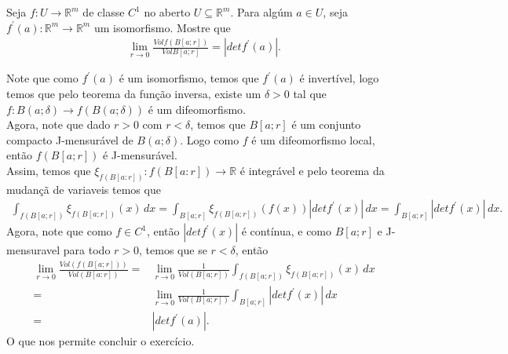 \begin{homeworkProblem}[Seção 5-1]
  Seja $f:U\to\mathbb{R}^{m}$ de classe $C^{1}$ no aberto $U\subseteq\mathbb{R}^{m}$. Para algúm $a\in U$, seja $f^{\prime}(a):\mathbb{R}^{m}\to\mathbb{R}^{m}$ um isomorfismo. Mostre que
  \begin{align*}
    \lim_{r \to 0}\frac{Vol f(B[a;r])}{Vol B[a;r]}=|det f^{\prime}(a)|.
  \end{align*}
  \begin{solution}
    Note que como $f^{\prime}(a)$ é um isomorfismo, temos que $f^{\prime}(a)$ é invertível, logo temos que pelo teorema da função inversa, existe um $\delta>0$ tal que $f:B(a;\delta)\to f(B(a;\delta))$ é um difeomorfismo.\\
    Agora, note que dado $r>0$ com $r<\delta$, temos que $B[a;r]$ é um conjunto compacto J-mensurável de $B(a;\delta)$. Logo como $f$ é um difeomorfismo local, então $f(B[a;r])$ é J-mensurável.\\
    Assim, temos que $\xi_{f(B[a:r])}:f(B[a:r])\to\mathbb{R}$ é integrável e pelo teorema da mudançã de variaveis temos que 
    \begin{align*}
      \int_{f(B[a;r])}\xi_{f(B[a;r])}(x)\,dx=\int_{B[a;r]}\xi_{f(B[a;r])}(f(x))|det f^{\prime}(x)|\,dx=\int_{B[a;r]}|det f^{\prime}(x)|\,dx.
    \end{align*}
    Agora, note que como $f\in C^{1}$, então $|det f^{\prime}(x)|$ é contínua, e como $B[a;r]$ e J-mensuravel para todo $r>0$, temos que se $r<\delta$, então
    \begin{align*}
      \lim_{r \to 0}\frac{Vol(f(B[a;r]))}{Vol(B[a:r])}=&\lim_{r \to 0}\frac{1}{Vol(B[a;r])}\int_{f(B[a;r])}\xi_{f(B[a;r])}(x)\,dx\\
      =&\lim_{r \to 0}\frac{1}{Vol(B[a;r])}\int_{B[a;r]}|det f^{\prime}(x)|\,dx\\
      =&|det f^{\prime}(a)|.
    \end{align*}
    O que nos permite concluir o exercício.
  \end{solution}
\end{homeworkProblem}
